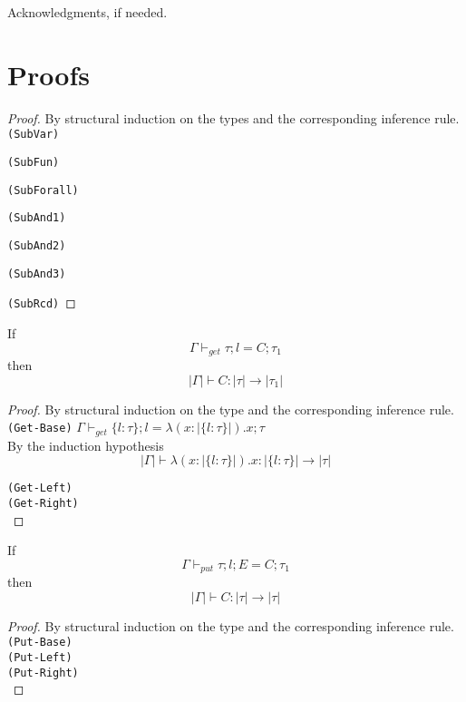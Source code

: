 \documentclass[preprint]{sigplanconf}
\begin{document}
\acks

Acknowledgments, if needed.

\appendix

\section{Proofs}

\begin{proof}
By structural induction on the types and the corresponding inference rule. \\

\texttt{(SubVar)}

\texttt{(SubFun)}

\texttt{(SubForall)}

\texttt{(SubAnd1)}

\texttt{(SubAnd2)}

\texttt{(SubAnd3)}

\texttt{(SubRcd)}

\end{proof}

\begin{lemma} \label{type-get}
  If $$ \Gamma \vdash_{get} \tau ; l = C ; \tau_1 $$
  then $$ |\Gamma| \vdash C : |\tau| \to |\tau_1| $$
\end{lemma}

\begin{proof}
By structural induction on the type and the corresponding inference rule. \\

\texttt{(Get-Base)} $ \Gamma \vdash_{get} \{ l : \tau \} ; l = \lambda (x : |\{ l : \tau \}|). x ; \tau $ \\

By the induction hypothesis
$$ |\Gamma| \vdash \lambda (x : |\{ l : \tau \}|). x : |\{ l : \tau \}| \to |\tau| $$

\texttt{(Get-Left)} \\
\texttt{(Get-Right)} \\

\end{proof}

\begin{lemma} \label{type-put}
  If $$ \Gamma \vdash_{put} \tau ; l ; E = C ; \tau_1 $$
  then $$ |\Gamma| \vdash C : |\tau| \to |\tau| $$
\end{lemma}

\begin{proof}
By structural induction on the type and the corresponding inference rule. \\

\texttt{(Put-Base)} \\
\texttt{(Put-Left)} \\
\texttt{(Put-Right)} \\
\end{proof}
\end{document}
